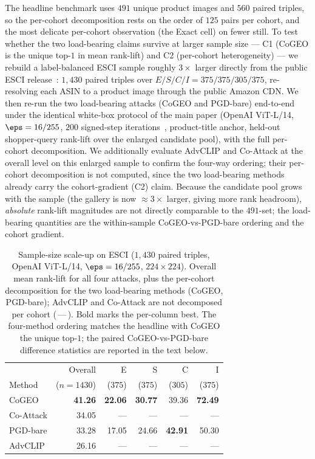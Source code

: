 The headline benchmark uses $491$ unique product images and $560$ paired triples, so the per-cohort decomposition rests on the order of $125$ pairs per cohort, and the most delicate per-cohort observation (the Exact cell) on fewer still. To test whether the two load-bearing claims survive at larger sample size --- C1 (CoGEO is the unique top-$1$ in mean rank-lift) and C2 (per-cohort heterogeneity) --- we rebuild a label-balanced ESCI sample roughly $3\times$ larger directly from the public ESCI release~\cite{reddy2022esci}: $1{,}430$ paired triples over $E/S/C/I = 375/375/305/375$, re-resolving each ASIN to a product image through the public Amazon CDN. We then re-run the two load-bearing attacks (CoGEO and PGD-bare) end-to-end under the identical white-box protocol of the main paper (OpenAI ViT-L/14, $\eps = 16/255$, $200$ signed-step iterations~\cite{madry2018pgd,dong2018mifgsm}, product-title anchor, held-out shopper-query rank-lift over the enlarged candidate pool), with the full per-cohort decomposition. We additionally evaluate AdvCLIP and Co-Attack at the overall level on this enlarged sample to confirm the four-way ordering; their per-cohort decomposition is not computed, since the two load-bearing methods already carry the cohort-gradient (C2) claim. Because the candidate pool grows with the sample (the gallery is now $\approx 3\times$ larger, giving more rank headroom), \emph{absolute} rank-lift magnitudes are not directly comparable to the $491$-set; the load-bearing quantities are the within-sample CoGEO-vs-PGD-bare ordering and the cohort gradient.

\begin{table}[t]
\centering
\caption{Sample-size scale-up on ESCI ($1{,}430$ paired triples, OpenAI ViT-L/14, $\eps = 16/255$, $224 \times 224$). Overall mean rank-lift for all four attacks, plus the per-cohort decomposition for the two load-bearing methods (CoGEO, PGD-bare); AdvCLIP and Co-Attack are not decomposed per cohort (\,---\,). Bold marks the per-column best. The four-method ordering matches the headline with CoGEO the unique top-$1$; the paired CoGEO-vs-PGD-bare difference statistics are reported in the text below.}
\label{sm:tab:esci-scaleup}
\footnotesize
\setlength{\tabcolsep}{4pt}
\begin{tabular}{lrrrrr}
\toprule
 & Overall & E & S & C & I \\
Method & ($n{=}1430$) & ($375$) & ($375$) & ($305$) & ($375$) \\
\midrule
CoGEO     & \textbf{41.26} & \textbf{22.06} & \textbf{30.77} & 39.36          & \textbf{72.49} \\
Co-Attack & 34.05          & ---            & ---            & ---            & ---            \\
PGD-bare  & 33.28          & 17.05          & 24.66          & \textbf{42.91} & 50.30          \\
AdvCLIP   & 26.16          & ---            & ---            & ---            & ---            \\
\bottomrule
\end{tabular}
\end{table}

